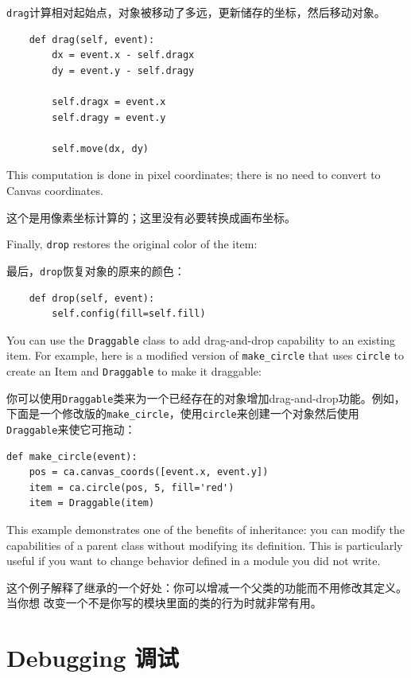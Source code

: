 \documentclass[10pt]{book}
\begin{document}
\begin{CJK}{UTF8}{gbsn}
{\tt drag}计算相对起始点，对象被移动了多远，更新储存的坐标，然后移动对象。

\begin{verbatim}
    def drag(self, event):
        dx = event.x - self.dragx
        dy = event.y - self.dragy

        self.dragx = event.x
        self.dragy = event.y

        self.move(dx, dy)
\end{verbatim}
%
This computation is done in pixel coordinates; there is no need to
convert to Canvas coordinates.

这个是用像素坐标计算的；这里没有必要转换成画布坐标。

Finally, {\tt drop} restores the original color of the item:

最后，{\tt drop}恢复对象的原来的颜色：

\begin{verbatim}
    def drop(self, event):
        self.config(fill=self.fill)
\end{verbatim}
%
You can use the {\tt Draggable} class to add drag-and-drop
capability to an existing item.  For example, here is a modified
version of \verb"make_circle" that uses {\tt circle} to create
an Item and {\tt Draggable} to make it draggable:

你可以使用{\tt Draggable}类来为一个已经存在的对象增加drag-and-drop功能。例如，
下面是一个修改版的\verb"make_circle"，使用{\tt circle}来创建一个对象然后使用
{\tt Draggable}来使它可拖动：

\begin{verbatim}
def make_circle(event):
    pos = ca.canvas_coords([event.x, event.y])
    item = ca.circle(pos, 5, fill='red')
    item = Draggable(item)
\end{verbatim}
%
This example demonstrates one of the benefits of inheritance: you can
modify the capabilities of a parent class without modifying its
definition.  This is particularly useful if you want to change
behavior defined in a module you did not write.

这个例子解释了继承的一个好处：你可以增减一个父类的功能而不用修改其定义。当你想
改变一个不是你写的模块里面的类的行为时就非常有用。


\section{Debugging 调试}


\end{CJK}
\end{document}
